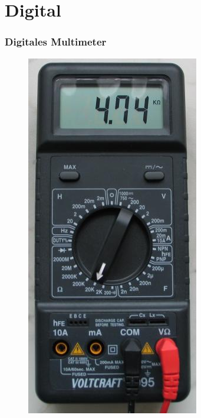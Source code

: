 \section*{Digital}

\begin{frame}
  \frametitle{Digitales Multimeter}
  \begin{center}
    \begin{figure}
      \includegraphics[width=.35\textwidth,height=.75\textheight,keepaspectratio]{e17/digitalmultimeter.jpg}
    \end{figure}
  \end{center}
\end{frame}

